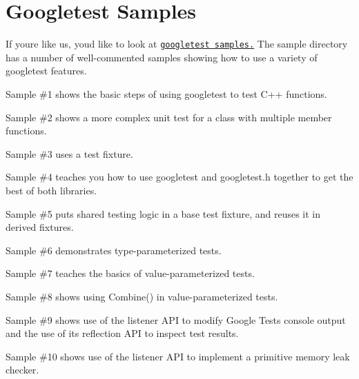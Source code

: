 \chapter{Googletest Samples }
\hypertarget{md_cmake-build-debug_2__deps_2googletest-src_2docs_2samples}{}\label{md_cmake-build-debug_2__deps_2googletest-src_2docs_2samples}
\label{md_cmake-build-debug_2__deps_2googletest-src_2docs_2samples_autotoc_md788}%
%


If you\textquotesingle{}re like us, you\textquotesingle{}d like to look at \href{https://github.com/google/googletest/blob/main/googletest/samples}{\texttt{googletest samples.}} The sample directory has a number of well-\/commented samples showing how to use a variety of googletest features.


\begin{DoxyItemize}
\item Sample \#1 shows the basic steps of using googletest to test C++ functions.
\item Sample \#2 shows a more complex unit test for a class with multiple member functions.
\item Sample \#3 uses a test fixture.
\item Sample \#4 teaches you how to use googletest and {\ttfamily googletest.\+h} together to get the best of both libraries.
\item Sample \#5 puts shared testing logic in a base test fixture, and reuses it in derived fixtures.
\item Sample \#6 demonstrates type-\/parameterized tests.
\item Sample \#7 teaches the basics of value-\/parameterized tests.
\item Sample \#8 shows using {\ttfamily Combine()} in value-\/parameterized tests.
\item Sample \#9 shows use of the listener API to modify Google Test\textquotesingle{}s console output and the use of its reflection API to inspect test results.
\item Sample \#10 shows use of the listener API to implement a primitive memory leak checker. 
\end{DoxyItemize}